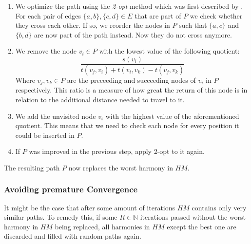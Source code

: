 \begin{enumerate}
  \item We optimize the path using the \emph{2-opt} method which was first described by \citeauthor{croes_method_1958}. \cite{croes_method_1958}
    For each pair of edges $\{a,b\}, \{c, d\} \in E$ that are part of $P$ we check whether they cross each other. 
    If so, we reorder the nodes in $P$ such that $\{a, c\}$ and $\{b, d\}$ are now part of the path instead. Now they do not cross anymore.
  \item We remove the node $v_i \in P$ with the lowest value of the following quotient:
    \begin{equation*}
      \frac{s(v_i)}{t(v_j, v_i) + t(v_i, v_k) - t(v_j, v_k)}
    \end{equation*}
    Where $v_j, v_k \in P$ are the preceeding and succeeding nodes of $v_i$ in $P$ respectively.
    This ratio is a measure of how great the return of this node is in relation to the additional distance needed to travel to it.
  \item We add the unvisited node $v_i$ with the highest value of the aforementioned quotient. 
    This means that we need to check each node for every position it could be inserted in $P$.
  \item If $P$ was improved in the previous step, apply 2-opt to it again.
\end{enumerate}

The resulting path $P$ now replaces the worst harmony in $HM$.

\subsubsection{Avoiding premature Convergence}

It might be the case that after some amount of iterations $HM$ contains only very similar paths.
To remedy this, if some $R \in \mathbb{N}$ iterations passed without the worst harmony in $HM$ being replaced,
all harmonies in $HM$ except the best one are discarded and filled with random paths again.

